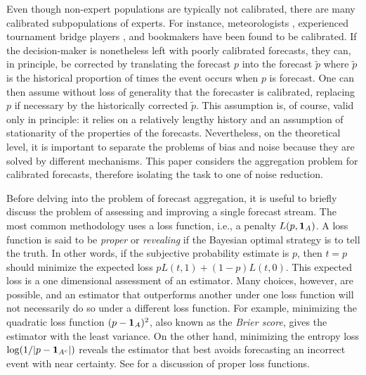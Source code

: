 \documentclass[12pt]{article}
\theoremstyle{definition}
\theoremstyle{definition}
\def\pt{\tilde{p}}
\def\one{{\bf 1}}
\begin{document}
Even though non-expert populations are typically not calibrated,  there are  many calibrated subpopulations of experts. For instance, meteorologists
\citep{murphy1977reliability}, experienced tournament bridge
players 
\citep{keren1987facing}, and bookmakers
\citep{dowie1976efficiency} have been found to be calibrated. If the decision-maker is nonetheless left with poorly
calibrated forecasts, they can, in principle, be corrected by
translating the forecast $p$ into the forecast $\pt$ where $\pt$ is
the historical proportion of times the event occurs when $p$ is
forecast.  One can then assume without loss of generality that the
forecaster is calibrated, replacing $p$ if necessary by the
historically corrected $\pt$. This assumption is, of course, valid
only in principle: it relies on a relatively lengthy history and an
assumption of stationarity of the properties of the forecasts.  
Nevertheless, on the
theoretical level, it is important to separate the problems of bias
and noise because they are solved by different mechanisms.  This
paper considers the aggregation problem for calibrated forecasts,
therefore isolating the task to one of noise reduction.

Before delving into the problem of forecast aggregation, it is useful
to briefly discuss the problem of assessing and improving a single
forecast stream.  The most common methodology uses a loss
function, i.e., a penalty $L(p , \one_A)$.  A loss function is said to
be {\em proper} or {\em revealing} if the Bayesian optimal strategy is
to tell the truth.  In other words, if the subjective probability
estimate is $p$, then $t = p$ should minimize the expected loss $p
L(t,1) + (1-p) L(t,0)$.  This expected loss is a one dimensional
assessment of an estimator. Many choices, however, are possible, and
an estimator that outperforms another under one loss function will not
necessarily do so under a different loss function.  For example,
minimizing the quadratic loss function $(p - \one_A)^2$, also known as
the {\em Brier score}, gives the estimator with the least variance. On
the other hand, minimizing the entropy loss $\log (1 / |p -
\one_{A^c}|)$ reveals the estimator that best avoids forecasting an
incorrect event with near certainty. See  \cite{HwPe1997}
for a discussion of proper loss functions.
\end{document}
